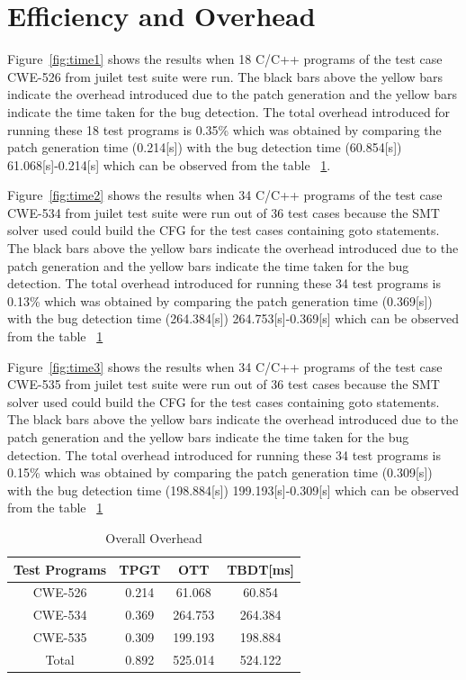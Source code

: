 \section{Efficiency and Overhead}
Figure~\ref{fig:time1} shows the results when 18 C/C++ programs
of the test case CWE-526 from juilet test suite were run. The black bars above
the yellow bars indicate the overhead introduced due to the patch generation
and the yellow bars indicate the time taken for the bug detection. The total
overhead introduced for running these 18 test programs is 0.35\% which was
obtained by comparing the patch generation time (0.214[s]) with the bug detection
time (60.854[s]) 61.068[s]-0.214[s] which can be observed from the table
~\ref{table:overall}.


Figure~\ref{fig:time2} shows the results when 34 C/C++ programs
of the test case CWE-534 from juilet test suite were run out
of 36 test cases because the SMT solver used
could build the CFG for the test cases containing goto statements. The black bars above
the yellow bars indicate the overhead introduced due to the patch generation
and the yellow bars indicate the time taken for the bug detection. The total
overhead introduced for running these 34 test programs is 0.13\% which was
obtained by comparing the patch generation time (0.369[s]) with the bug detection
time (264.384[s]) 264.753[s]-0.369[s] which can be observed from the table
~\ref{table:overall}



Figure~\ref{fig:time3} shows the results when 34 C/C++ programs
of the test case CWE-535 from juilet test suite were run out
of 36 test cases because the SMT solver used
could build the CFG for the test cases containing goto statements. The black bars above
the yellow bars indicate the overhead introduced due to the patch generation
and the yellow bars indicate the time taken for the bug detection. The total
overhead introduced for running these 34 test programs is 0.15\% which was
obtained by comparing the patch generation time (0.309[s]) with the bug detection
time (198.884[s]) 199.193[s]-0.309[s] which can be observed from the table
~\ref{table:overall}

\begin{table}[h!]
\centering
 \begin{tabular}{||c |c |c |c ||} 
 \hline
 \textbf{Test Programs} & \textbf{TPGT} & \textbf{OTT} & \textbf{TBDT[ms]}\\ [0.5ex] 
 \hline\hline
 CWE-526&0.214&61.068&60.854\\
 \hline
 CWE-534&0.369&264.753&264.384\\
 \hline
 CWE-535&0.309&199.193&198.884\\
 \hline
Total&0.892&525.014&524.122\\
 \hline\hline
\end{tabular}
\caption{Overall Overhead}
\label{table:overall}
\end{table}

